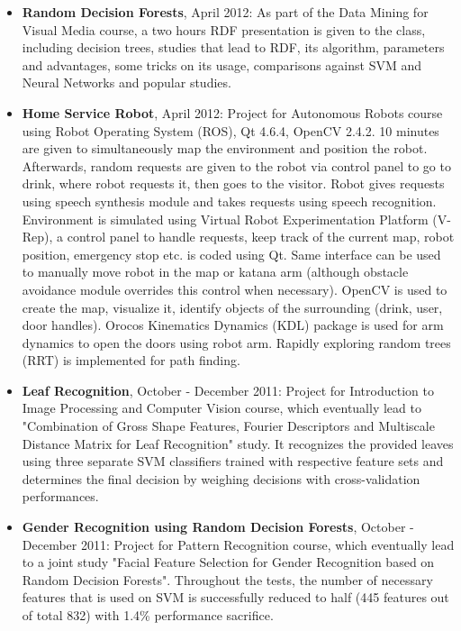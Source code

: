 \documentclass[margin]{res}
\begin{document}
\begin{resume}
\begin{itemize}
			\item {\bf Random Decision Forests}, April 2012: As part of the Data Mining for Visual Media course, a two hours RDF presentation is given to the class, including decision trees, studies that lead to RDF, its algorithm, parameters and advantages, some tricks on its usage, comparisons against SVM and Neural Networks and popular studies.\\
			
			\item {\bf Home Service Robot}, April 2012: Project for Autonomous Robots course using Robot Operating System (ROS), Qt 4.6.4, OpenCV 2.4.2. 10 minutes are given to simultaneously map the environment and position the robot. Afterwards, random requests are given to the robot via control panel to go to drink, where robot requests it, then goes to the visitor. Robot gives requests using speech synthesis module and takes requests using speech recognition. Environment is simulated using Virtual Robot Experimentation Platform (V-Rep), a control panel to handle requests, keep track of the current map, robot position, emergency stop etc. is coded using Qt. Same interface can be used to manually move robot in the map or katana arm (although obstacle avoidance module overrides this control when necessary). OpenCV is used to create the map, visualize it, identify objects of the surrounding (drink, user, door handles). Orocos Kinematics Dynamics (KDL) package is used for arm dynamics to open the doors using robot arm. Rapidly exploring random trees (RRT) is implemented for path finding.\\	           	
			
			\item {\bf Leaf Recognition}, October - December 2011: Project for Introduction to Image Processing and Computer Vision course, which eventually lead to "Combination of Gross Shape Features, Fourier Descriptors and Multiscale Distance Matrix for Leaf Recognition" study. It recognizes the provided leaves using three separate SVM classifiers trained with respective feature sets and determines the final decision by weighing decisions with cross-validation performances.\\
			\item {\bf Gender Recognition using Random Decision Forests}, October - December 2011: Project for Pattern Recognition course, which eventually lead to a joint study "Facial Feature Selection for Gender Recognition based on Random Decision Forests". Throughout the tests, the number of necessary features that is used on SVM is successfully reduced to half (445 features out of total 832) with 1.4\% performance sacrifice.\\
			
			
		\end{itemize}
		
	\end{resume} 
\end{document}
